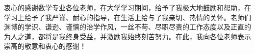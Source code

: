 
\begin{acknowledgement}

衷心的感谢数学专业各位老师，在大学学习期间，给予了我极大地鼓励和帮助，在学习上给予了我严谨、耐心的指导，在生活上给与了我亲切、热情的关怀。老师们渊博的学识、谦逊、谨慎的治学作风，一丝不苟、尽职尽责的工作态度以及正直的为人之道，都将是我终身受益，并激励我始终刻苦努力。在此，我向各位老师表示崇高的敬意和衷心的感谢！

\end{acknowledgement}

